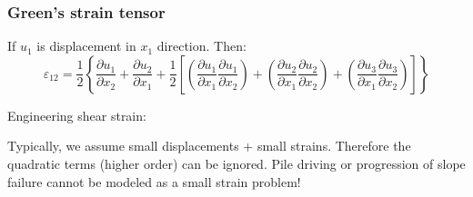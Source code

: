 \documentclass[notes]{beamer}
\begin{document}
\begin{frame}
\frametitle{Green's strain tensor}
If $u_1$ is displacement in $x_1$ direction. Then:
\begin{equation*}
\varepsilon_{12} = \frac{1}{2}\left\{\frac{\partial u_1}{\partial x_2} + \frac{\partial u_2}{\partial x_1} + \frac{1}{2} \left[\left(\frac{\partial u_1}{\partial x_1}\frac{\partial u_1}{\partial x_2}\right) +
\left(\frac{\partial u_2}{\partial x_1}\frac{\partial u_2}{\partial x_2}\right) + \left(\frac{\partial u_3}{\partial x_1}\frac{\partial u_3}{\partial x_2}\right)\right]\right\}
\end{equation*}

Engineering shear strain: 

Typically, we assume small displacements + small strains. Therefore the quadratic terms (higher order) can be ignored. Pile driving or progression of slope failure cannot be modeled as a small strain problem!
\end{frame}
\end{document}
